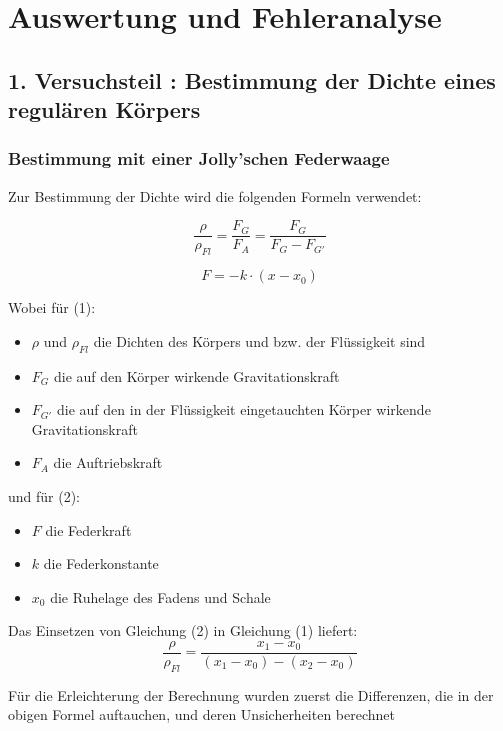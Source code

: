 \documentclass[11pt,a4paper]{article} %
\begin{document}
\newpage


\section{Auswertung und Fehleranalyse}

\subsection{1. Versuchsteil : Bestimmung der Dichte  eines regulären Körpers}

\subsubsection{Bestimmung mit einer Jolly'schen Federwaage}
Zur Bestimmung der Dichte wird die folgenden Formeln verwendet:

\begin{equation}
\frac{\rho}{\rho_{Fl}} = \frac{F_{G}}{F_{A}} = \frac{F_G}{F_G - F_{G'}}
\end{equation}

\begin{equation}
F = -k\cdot(x-x_0)
\end{equation}

Wobei für (1):
\begin{itemize}
	\item $\rho$ und $\rho_{Fl}$ die Dichten des Körpers und bzw. der Flüssigkeit sind
	\item $F_G$ die auf den Körper wirkende Gravitationskraft
	\item $F_{G'}$ die auf den in der Flüssigkeit eingetauchten Körper wirkende Gravitationskraft
	\item $F_A$ die Auftriebskraft
\end{itemize}

und für (2):
\begin{itemize}
	\item $F$ die Federkraft
	\item $k$ die Federkonstante
	\item $x_0$ die Ruhelage des Fadens und Schale
\end{itemize}

Das Einsetzen von Gleichung (2) in Gleichung (1) liefert: 
\begin{equation}
\frac{\rho}{\rho_{Fl}} = \frac{x_1-x_0}{(x_1-x_0)-(x_2-x_0)}
\end{equation}

Für die Erleichterung der Berechnung wurden zuerst die Differenzen, die in der obigen Formel auftauchen, und deren Unsicherheiten berechnet
\end{document}
